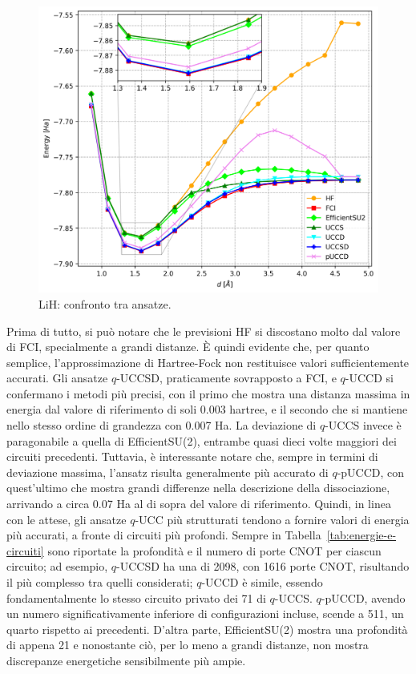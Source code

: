 \begin{figure}[H]
    \centering
    \hspace{-0.9cm}
    \includegraphics[width=.6\linewidth]{Immagini/Capitolo_3/LiH_ground.png}
    \caption{LiH: confronto tra ansatze.}
    \label{fig:LiH-confronti}
\end{figure}



Prima di tutto, si può notare che le previsioni HF si discostano molto dal valore di FCI, specialmente a grandi distanze. È quindi evidente che, per quanto semplice, l'approssimazione di Hartree-Fock non restituisce valori sufficientemente accurati.
Gli ansatze $q$-UCCSD, praticamente sovrapposto a FCI, e $q$-UCCD si confermano i metodi \inglese{} più precisi, con il primo che mostra una distanza massima in energia dal valore di riferimento di soli 0.003 hartree, e il secondo che si mantiene nello stesso ordine di grandezza con 0.007 Ha. La deviazione di $q$-UCCS invece è paragonabile a quella di EfficientSU(2), entrambe quasi dieci volte maggiori dei circuiti precedenti. Tuttavia, è interessante notare che, sempre in termini di deviazione massima, l'ansatz  risulta generalmente più accurato di $q$-pUCCD, con quest'ultimo che mostra grandi differenze nella descrizione della dissociazione, arrivando a circa 0.07 Ha al di sopra del valore di riferimento.  
Quindi, in linea con le attese, gli ansatze $q$-UCC più strutturati tendono a fornire valori di energia più accurati, a fronte di circuiti più profondi. Sempre in Tabella~\ref{tab:energie-e-circuiti} sono riportate la profondità e il numero di porte CNOT per ciascun circuito; ad esempio, $q$-UCCSD ha una  di 2098, con 1616 porte CNOT, risultando il più complesso tra quelli considerati; $q$-UCCD è simile, essendo fondamentalmente lo stesso circuito privato dei 71  di $q$-UCCS. $q$-pUCCD, avendo un numero significativamente inferiore di configurazioni incluse, scende a 511, un quarto rispetto ai precedenti. D’altra parte, EfficientSU(2) mostra una profondità di appena 21 e nonostante ciò, per lo meno a grandi distanze, non mostra discrepanze energetiche sensibilmente più ampie.


